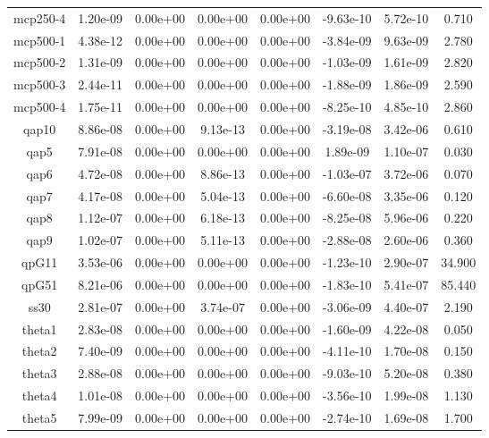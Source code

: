 {{\begin{table}[h]
\begin{center}
{\begin{tabular}{cccccccc}
            mcp250-4 & 1.20e-09 & 0.00e+00 & 0.00e+00 & 0.00e+00 & -9.63e-10 & 5.72e-10 & 0.710 \\ 
            mcp500-1 & 4.38e-12 & 0.00e+00 & 0.00e+00 & 0.00e+00 & -3.84e-09 & 9.63e-09 & 2.780 \\ 
            mcp500-2 & 1.31e-09 & 0.00e+00 & 0.00e+00 & 0.00e+00 & -1.03e-09 & 1.61e-09 & 2.820 \\ 
            mcp500-3 & 2.44e-11 & 0.00e+00 & 0.00e+00 & 0.00e+00 & -1.88e-09 & 1.86e-09 & 2.590 \\ 
            mcp500-4 & 1.75e-11 & 0.00e+00 & 0.00e+00 & 0.00e+00 & -8.25e-10 & 4.85e-10 & 2.860 \\ 
               qap10 & 8.86e-08 & 0.00e+00 & 9.13e-13 & 0.00e+00 & -3.19e-08 & 3.42e-06 & 0.610 \\ 
                qap5 & 7.91e-08 & 0.00e+00 & 0.00e+00 & 0.00e+00 & 1.89e-09 & 1.10e-07 & 0.030 \\ 
                qap6 & 4.72e-08 & 0.00e+00 & 8.86e-13 & 0.00e+00 & -1.03e-07 & 3.72e-06 & 0.070 \\ 
                qap7 & 4.17e-08 & 0.00e+00 & 5.04e-13 & 0.00e+00 & -6.60e-08 & 3.35e-06 & 0.120 \\ 
                qap8 & 1.12e-07 & 0.00e+00 & 6.18e-13 & 0.00e+00 & -8.25e-08 & 5.96e-06 & 0.220 \\ 
                qap9 & 1.02e-07 & 0.00e+00 & 5.11e-13 & 0.00e+00 & -2.88e-08 & 2.60e-06 & 0.360 \\ 
               qpG11 & 3.53e-06 & 0.00e+00 & 0.00e+00 & 0.00e+00 & -1.23e-10 & 2.90e-07 & 34.900 \\ 
               qpG51 & 8.21e-06 & 0.00e+00 & 0.00e+00 & 0.00e+00 & -1.83e-10 & 5.41e-07 & 85.440 \\ 
                ss30 & 2.81e-07 & 0.00e+00 & 3.74e-07 & 0.00e+00 & -3.06e-09 & 4.40e-07 & 2.190 \\ 
              theta1 & 2.83e-08 & 0.00e+00 & 0.00e+00 & 0.00e+00 & -1.60e-09 & 4.22e-08 & 0.050 \\ 
              theta2 & 7.40e-09 & 0.00e+00 & 0.00e+00 & 0.00e+00 & -4.11e-10 & 1.70e-08 & 0.150 \\ 
              theta3 & 2.88e-08 & 0.00e+00 & 0.00e+00 & 0.00e+00 & -9.03e-10 & 5.20e-08 & 0.380 \\ 
              theta4 & 1.01e-08 & 0.00e+00 & 0.00e+00 & 0.00e+00 & -3.56e-10 & 1.99e-08 & 1.130 \\ 
              theta5 & 7.99e-09 & 0.00e+00 & 0.00e+00 & 0.00e+00 & -2.74e-10 & 1.69e-08 & 1.700 \\ 

\end{tabular}}
\end{center}
\end{table}}}
